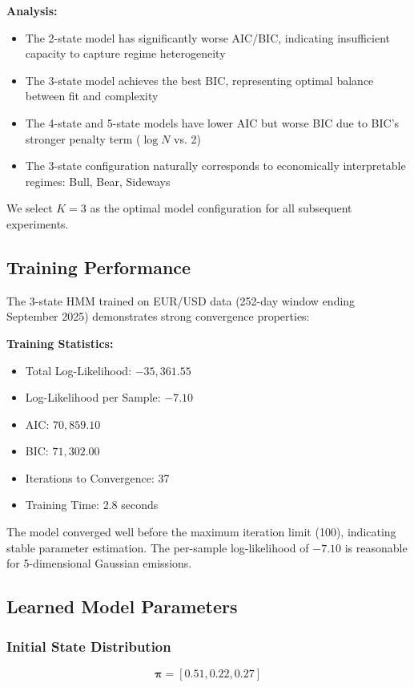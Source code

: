 \documentclass[conference]{IEEEtran}
\begin{document}
\textbf{Analysis:}
\begin{itemize}
\item The 2-state model has significantly worse AIC/BIC, indicating insufficient capacity to capture regime heterogeneity
\item The 3-state model achieves the best BIC, representing optimal balance between fit and complexity
\item The 4-state and 5-state models have lower AIC but worse BIC due to BIC's stronger penalty term ($\log N$ vs. 2)
\item The 3-state configuration naturally corresponds to economically interpretable regimes: Bull, Bear, Sideways
\end{itemize}

We select $K=3$ as the optimal model configuration for all subsequent experiments.

\subsection{Training Performance}

The 3-state HMM trained on EUR/USD data (252-day window ending September 2025) demonstrates strong convergence properties:

\textbf{Training Statistics:}
\begin{itemize}
\item Total Log-Likelihood: $-35,361.55$
\item Log-Likelihood per Sample: $-7.10$
\item AIC: $70,859.10$
\item BIC: $71,302.00$
\item Iterations to Convergence: 37
\item Training Time: 2.8 seconds
\end{itemize}

The model converged well before the maximum iteration limit (100), indicating stable parameter estimation. The per-sample log-likelihood of $-7.10$ is reasonable for 5-dimensional Gaussian emissions.

\subsection{Learned Model Parameters}

\subsubsection{Initial State Distribution}
\begin{equation}
\boldsymbol{\pi} = [0.51, 0.22, 0.27]
\end{equation}
\end{document}
